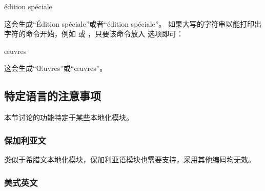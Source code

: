 \begin{ltxsyntax}
\begin{ltxexample}
\autocap{\'e}dition sp\'eciale
\end{ltxexample}
%
这会生成“Édition spéciale”或者“édition spéciale”。
如果大写的字符串以能打印出字符的命令开始，例如  或 ，只要该命令放入  选项即可：

\begin{ltxexample}
\autocap{\oe}uvres
\end{ltxexample}
%
这会生成“Œuvres”或“œuvres”。

\end{ltxsyntax}

\subsection[关于语言的注意事项]{特定语言的注意事项}%
\label{use:loc}

本节讨论的功能特定于某些本地化模块。

\subsubsection{保加利亚文}%
\label{use:loc:bul}

类似于希腊文本地化模块，保加利亚语模块也需要\utf 支持，采用其他编码均无效。

\subsubsection{美式英文}%
\label{use:loc:us}

